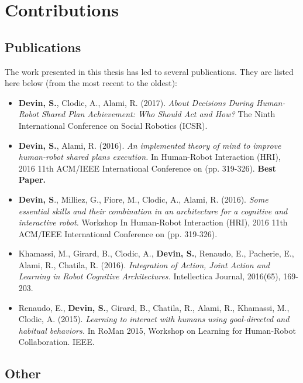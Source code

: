 \documentclass[english,a4paper,11pt,twoside]{StyleThese}
\begin{document}
\newpage
\section*{Contributions}

\subsection*{Publications}

The work presented in this thesis has led to several publications. They are listed here below (from the most recent to the oldest):
\begin{itemize}
\item \textbf{Devin, S.}, Clodic, A., Alami, R. (2017). \textit{About Decisions During Human-Robot Shared Plan Achievement: Who Should Act and How?} The Ninth International Conference on Social Robotics (ICSR).
\item \textbf{Devin, S.}, Alami, R. (2016). \textit{An implemented theory of mind to improve human-robot shared plans execution.} In Human-Robot Interaction (HRI), 2016 11th ACM/IEEE International Conference on (pp. 319-326). \textbf{Best Paper.}
\item \textbf{Devin, S}., Milliez, G., Fiore, M., Clodic, A., Alami, R. (2016). \textit{Some essential skills and their combination in an architecture for a cognitive and interactive robot.} Workshop In Human-Robot Interaction (HRI), 2016 11th ACM/IEEE International Conference on (pp. 319-326).
\item Khamassi, M., Girard, B., Clodic, A., \textbf{Devin, S.}, Renaudo, E., Pacherie, E., Alami, R., Chatila, R. (2016). \textit{Integration of Action, Joint Action and Learning in Robot Cognitive Architectures.} Intellectica Journal, 2016(65), 169-203.
\item Renaudo, E., \textbf{Devin, S.}, Girard, B., Chatila, R., Alami, R., Khamassi, M., Clodic, A. (2015). \textit{Learning to interact with humans using goal-directed and habitual behaviors.} In RoMan 2015, Workshop on Learning for Human-Robot Collaboration. IEEE.
\end{itemize}

\subsection*{Other}
\end{document}
